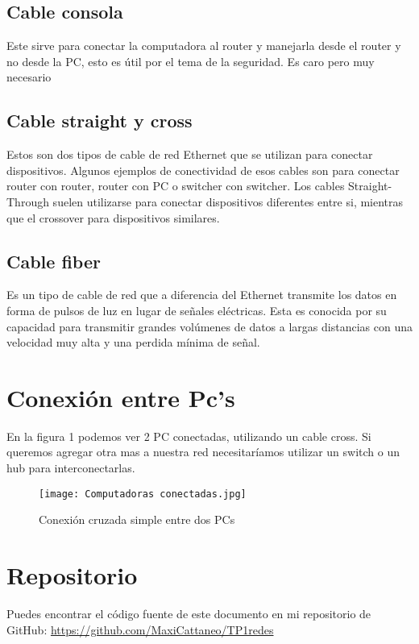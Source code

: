 \documentclass{article}
\begin{document}
\subsection{Cable consola}
Este sirve para conectar la computadora al router y manejarla desde el router y no desde la PC, esto es útil por el tema de la seguridad. Es caro pero muy necesario

\subsection{Cable straight y cross}
Estos son dos tipos de cable de red Ethernet que se utilizan para conectar dispositivos. Algunos ejemplos de conectividad de esos cables son para conectar router con router, router con PC o switcher con switcher. Los cables Straight-Through suelen utilizarse para conectar dispositivos diferentes entre si, mientras que el crossover para dispositivos similares.

\subsection{Cable fiber}
Es un tipo de cable de red que a diferencia del Ethernet transmite los datos en forma de pulsos de luz en lugar de señales eléctricas. Esta es conocida por su capacidad para transmitir grandes volúmenes de datos a largas distancias con una velocidad muy alta y una perdida mínima de señal.

\section{Conexión entre Pc's}
En la figura 1 podemos ver 2 PC conectadas, utilizando un cable cross. Si queremos agregar otra mas a nuestra red necesitaríamos utilizar un switch o un hub para interconectarlas.

\begin{figure}
\centering
\texttt{[image: Computadoras conectadas.jpg]}
\caption{Conexión cruzada simple entre dos PCs}
\label{}
\end{figure}

\section*{Repositorio}
Puedes encontrar el código fuente de este documento en mi repositorio de GitHub: \url{https://github.com/MaxiCattaneo/TP1redes}
\end{document}
